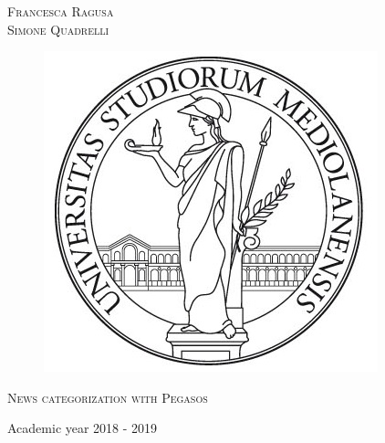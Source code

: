 \documentclass{article}
\begin{document}
\begin{titlepage}
	
	
	\begin{center}
		\vspace{2 cm}
		{\Large \textsc{Francesca Ragusa\\	} }
		{\Large \textsc{Simone Quadrelli} }
	\end{center}
	
	
	\begin{figure}[H]
		\vspace{2 cm}
		\centering
		\includegraphics[width=0.30\linewidth]{tesiSCIENZE_TECNOLOGIE.jpg}
		
	\end{figure}
	
	\begin{center}
		\vspace{2 cm}
		{\Large \textsc{News categorization with Pegasos} }
	\end{center}

	\par
	\vspace{3 cm}
	
	\begin{center}
		{\large Academic year 2018 - 2019}
	\end{center}
\end{titlepage}



\newpage 
{}
\tableofcontents
\listofalgorithms
\listoftables
\listoffigures
\newpage

\end{document}
